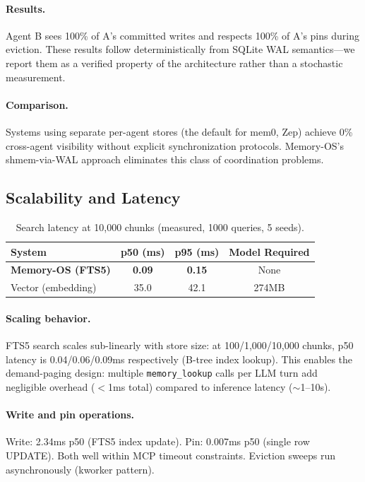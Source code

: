 \documentclass[10pt,twocolumn]{article}
\begin{document}
\paragraph{Results.} Agent B sees 100\% of A's committed writes and respects 100\% of A's pins during eviction. These results follow deterministically from SQLite WAL semantics---we report them as a verified property of the architecture rather than a stochastic measurement.

\paragraph{Comparison.} Systems using separate per-agent stores (the default for mem0, Zep) achieve 0\% cross-agent visibility without explicit synchronization protocols. Memory-OS's shmem-via-WAL approach eliminates this class of coordination problems.

\subsection{Scalability and Latency}

\begin{table}[!htb]
\centering
\caption{Search latency at 10{,}000 chunks (measured, 1000 queries, 5 seeds).}
\label{tab:latency}
\small
\begin{tabular}{lccc}
\toprule
System & p50 (ms) & p95 (ms) & Model Required \\
\midrule
\textbf{Memory-OS (FTS5)} & \textbf{0.09} & \textbf{0.15} & None \\
Vector (embedding)         & 35.0           & 42.1          & 274MB \\
\bottomrule
\end{tabular}
\end{table}

\paragraph{Scaling behavior.} FTS5 search scales sub-linearly with store size: at 100/1{,}000/10{,}000 chunks, p50 latency is 0.04/0.06/0.09ms respectively (B-tree index lookup). This enables the demand-paging design: multiple \texttt{memory\_lookup} calls per LLM turn add negligible overhead ($<$1ms total) compared to inference latency ($\sim$1--10s).

\paragraph{Write and pin operations.} Write: 2.34ms p50 (FTS5 index update). Pin: 0.007ms p50 (single row UPDATE). Both well within MCP timeout constraints. Eviction sweeps run asynchronously (kworker pattern).
\end{document}
